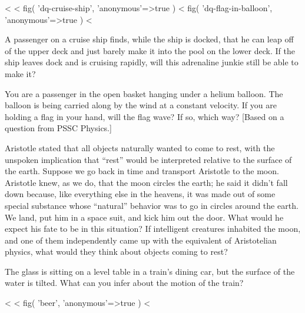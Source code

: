 
\startdqs

<%
<%
  fig(
    'dq-cruise-ship',
    {
      'anonymous'=>true
    }
  )
\spacebetweenfigs
<%
  fig(
    'dq-flag-in-balloon',
    {
      'anonymous'=>true
    }
  )
<%
\begin{dq}\label{dq:cruise-ship}
A passenger on a cruise ship finds, while the ship is
docked, that he can leap off of the upper deck and just
barely make it into the pool on the lower deck.  If the ship
leaves dock and is cruising rapidly, will this adrenaline
junkie still be able to make it?
\end{dq}

\begin{dq}\label{dq:flag-in-balloon}
You are a passenger in the open basket hanging under a
helium balloon. The balloon is being carried along by the
wind at a constant velocity. If you are holding a flag in
your hand, will the flag wave? If so, which way? [Based on a
question from PSSC Physics.]
\end{dq}

\begin{dq}
Aristotle stated that all objects naturally wanted to
come to rest, with the unspoken implication that ``rest''
would be interpreted relative to the surface of the earth.
Suppose we go back in time and transport Aristotle to the
moon. Aristotle knew, as we do, that the moon circles the
earth; he said it didn't fall down because, like everything
else in the heavens, it was made out of some special
substance whose ``natural'' behavior was to go in circles
around the earth. We land, put him in a space suit, and kick
him out the door. What would he expect his fate to be in
this situation? If intelligent creatures inhabited the moon,
and one of them independently came up with the equivalent of
Aristotelian physics, what would they think about objects coming to rest?
\end{dq}

\begin{dq}\label{dq:beer}
The glass is sitting on a level table in a train's
dining car, but the surface of the water is tilted. What can
you infer about the motion of the train?
\end{dq}
<%
<%
  fig(
    'beer',
    {
      'anonymous'=>true
    }
  )
<%

